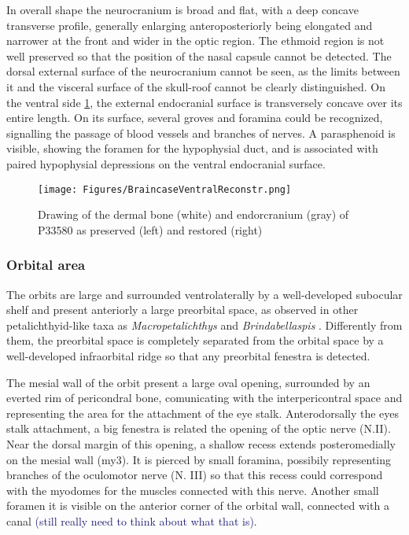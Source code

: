 \documentclass[12pt,letterpaper]{article}
\begin{document}
In overall shape the neurocranium is broad and flat, with a deep concave transverse profile, generally enlarging anteroposteriorly being elongated and narrower at the front and wider in the optic region. The ethmoid region is not well preserved so that the position of the nasal capsule cannot be detected. The dorsal external surface of the neurocranium cannot be seen, as the limits between it and the visceral surface of the skull-roof cannot be clearly distinguished. On the ventral side \ref{ventralreconstr}, the external endocranial surface is transversely concave over its entire length. On its surface, several groves and foramina could be recognized, signalling the passage of blood vessels and branches of nerves. A parasphenoid is visible, showing the foramen for the hypophysial duct, and is associated with paired hypophysial depressions on the ventral endocranial surface.

\begin{figure}[!h]
\centering
    \texttt{[image: Figures/BraincaseVentralReconstr.png]}
\caption{\footnotesize{Drawing of the dermal bone (white) and endorcranium (gray) of P33580 as preserved (left) and restored (right)}}
\label{ventralreconstr}
\end{figure}

\subsubsection{Orbital area}

The orbits are large and surrounded ventrolaterally by a well-developed subocular shelf and present anteriorly a large preorbital space, as observed in other petalichthyid-like taxa as \textit{Macropetalichthys} \citep{Stensio1925,Stensi1963b,Stensio1969} and \textit{Brindabellaspis} \citep{Young1980}. Differently from them, the preorbital space is completely separated from the orbital space by a well-developed infraorbital ridge so that any preorbital fenestra is detected. 

The mesial wall of the orbit present a large oval opening, surrounded by an everted rim of pericondral bone, comunicating with the interpericontral space and representing the area for the attachment of the eye stalk. Anterodorsally the eyes stalk attachment, a big fenestra is related the opening of the optic nerve (N.II). Near the dorsal margin of this opening, a shallow recess extends posteromedially on the mesial wall (my3). It is pierced by small foramina, possibily representing branches of the oculomotor nerve (N. III) so that this recess could correspond with the myodomes for the muscles connected with this nerve. Another small foramen it is visible on the anterior corner of the orbital wall, connected with a canal \textcolor{MidnightBlue}{(still really need to think about what that is)}. 
\end{document}
